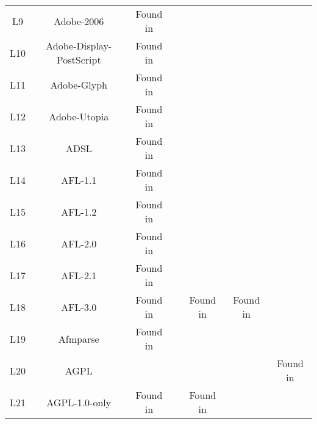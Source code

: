\begin{table}[]
\begin{tabular}{c|c|c|c|c|c|c}
  L9                             & Adobe-2006                                     & Found in      &               &              &              &              \\
  L10                            & Adobe-Display-PostScript                       & Found in      &               &              &              &              \\
  L11                            & Adobe-Glyph                                    & Found in      &               &              &              &              \\
  L12                            & Adobe-Utopia                                   & Found in      &               &              &              &              \\
  L13                            & ADSL                                           & Found in      &               &              &              &              \\
  L14                            & AFL-1.1                                        & Found in      &               &              &              &              \\
  L15                            & AFL-1.2                                        & Found in      &               &              &              &              \\
  L16                            & AFL-2.0                                        & Found in      &               &              &              &              \\
  L17                            & AFL-2.1                                        & Found in      &               &              &              &              \\
  L18                            & AFL-3.0                                        & Found in      &               & Found in     & Found in     &              \\
  L19                            & Afmparse                                       & Found in      &               &              &              &              \\
  L20                            & AGPL                                           &               &               &              &              & Found in     \\
  L21                            & AGPL-1.0-only                                  & Found in      &               & Found in     &              &              \\

\end{tabular}
\end{table}
